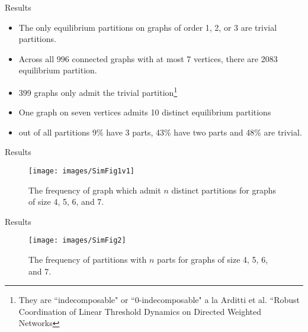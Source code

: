 \documentclass{beamer}
\begin{document}
\begin{frame}{Results}
	\begin{itemize} 
	\item The only equilibrium partitions on graphs of order 1, 2, or 3 are trivial partitions.  
	\item Across all 996 connected graphs with at most 7 vertices, there are 2083 equilibrium partition.
	\item 399 graphs only admit the trivial partition\footnote{They are ``indecomposable"  or ``0-indecomposable" a la Arditti et al. ``Robust Coordination of Linear Threshold Dynamics on Directed Weighted Networks} 
	\item One graph on seven vertices admits 10 distinct equilibrium partitions
	\item out of all partitions 9\% have 3 parts, 43\% have two parts and 48\% are trivial. 
\end{itemize}
\end{frame}

\begin{frame}{Results}
	\begin{figure}
		\texttt{[image: images/SimFig1v1]}
		\caption{The frequency of graph which admit $n$ distinct partitions for graphs of size 4, 5, 6, and 7. }
	\end{figure}
	
\end{frame}

\begin{frame}{Results}
	\begin{figure}
		\texttt{[image: images/SimFig2]}
		\caption{The frequency of partitions with $n$ parts for graphs of size 4, 5, 6, and 7. }
	\end{figure}
	
\end{frame}
\end{document}
